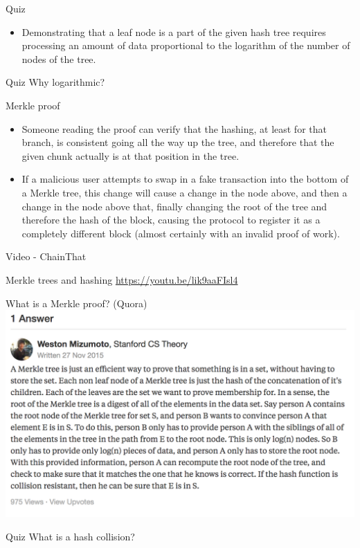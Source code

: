 \documentclass[presentation]{beamer}
\begin{document}
\begin{frame}[label=sec-2-10]{Quiz}
\begin{itemize}
\item Demonstrating that a leaf node is a part of the given hash tree requires processing an amount of data proportional to the \alert{logarithm of the number of nodes of the tree}.
\end{itemize}
\begin{alertblock}{Quiz}
Why logarithmic?
\end{alertblock}
\end{frame}

\begin{frame}[label=sec-2-11]{Merkle proof}
\begin{itemize}
\item Someone reading the proof can verify that the hashing, at least for that branch, is consistent going all the way up the tree, and therefore that the given chunk actually is at that position in the tree.
\item If a \alert{malicious user} attempts to swap in a \alert{fake transaction} into the bottom of a Merkle tree, this change will cause a change in the node above, and then a change in the node above that, finally \alert{changing the root of the tree and therefore the hash of the block}, causing the protocol to register it as a completely different block (almost certainly with an invalid \alert{proof of work}).
\end{itemize}
\end{frame}
\begin{frame}[label=sec-2-12]{Video - ChainThat}
\begin{alertblock}{Merkle trees and hashing}
\url{https://youtu.be/lik9aaFIsl4}
\end{alertblock}
\end{frame}

\begin{frame}[label=sec-2-13]{What is a Merkle proof? (Quora)}
\includegraphics[width=.9\linewidth]{../images/merkle_proof.png}

\begin{alertblock}{Quiz}
What is a \alert{hash collision}?
\end{alertblock}
\end{frame}
\end{document}
